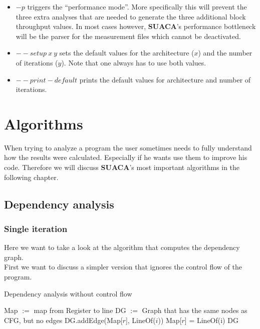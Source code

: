 \documentclass[a4paper,12pt,titlepage, twoside]{report}
\newcommand{\suaca}{\textbf{SUACA}}
\begin{document}
\begin{itemize}
    \item $-p$ triggers the ``performance mode''. More specifically this will prevent the three extra analyses that are needed to generate the three additional block throughput values. In most cases however, \suaca's performance bottleneck will be the parser for the measurement files which cannot be deactivated. 
    \item ${--}setup\ x\ y$ sets the default values for the architecture ($x$) and the number of iterations ($y$). Note that one always has to use both values. 
    \item ${--}print-default$ prints the default values for architecture and number of iterations.
\end{itemize}










\chapter{Algorithms}

When trying to analyze a program the user sometimes needs to fully understand how the results were calculated. Especially if he wants use them to improve his code. Therefore we will discuss \suaca's most important algorithms in the following chapter.

\section{Dependency analysis}
\label{sec:depanalysis}

\subsection{Single iteration}

Here we want to take a look at the algorithm that computes the dependency graph. \\
First we want to discuss a simpler version that ignores the control flow of the program.

\begin{algorithm}[H]
    \SetAlgoLined
    \caption{Dependency analysis without control flow}
    Map $:=$ map from Register to line\;
    DG $:=$ Graph that has the same nodes as CFG, but no edges\;
     {
          {
              {
                 DG.addEdge(Map[$r$], LineOf($i$))\;
             }{
                Map[$r$] = LineOf(i)\;
            }
        }
    }
    \Return DG\;
\end{algorithm}
\end{document}
